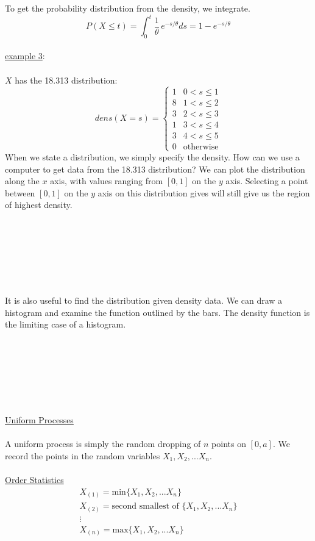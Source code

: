To get the probability distribution from the density, we integrate.
$$P(X\leq t)=\int_{0}^{t} \frac{1}{\theta}\, e^{-s/\theta}ds = 1 - e^{-s/\theta}$$
\\
\underline{example 3}:\\\\$X$ has the 18.313 distribution:
$$dens(X=s)=\left\{\begin{array}{llllll}1&0<s\leq 1\\8&1<s\leq 2\\3&2<s\leq 3\\1&3<s\leq 4\\3&4<s\leq 5\\0&\mbox{otherwise}\end{array}\right.$$  
When we state a distribution, we simply specify the density.  How can we use a computer to get data from the 18.313 distribution?  We can plot the distribution along the $x$ axis, with values ranging from $[0,1]$ on the $y$ axis.  Selecting a point between $[0,1]$ on the $y$ axis on this distribution gives will still give us the region of highest density.\\\\\\\\\\\\\\\\
It is also useful to find the distribution given density data.  We can draw a histogram and examine the function outlined by the bars.  The density function is the limiting case of a histogram.\\\\\\\\\\\\\\\\\underline{Uniform Processes}\\\\A uniform process is simply the random dropping of $n$ points on $[0,a]$.  We record the points in the random variables $X_1, X_2,...X_n$.\\\\\underline{Order Statistics}$$\begin{array}{lllll}X_{(1)}=\mbox{min}\{X_1,X_2,...X_n\}\\X_{(2)}=\mbox{second smallest of } \{X_1,X_2,...X_n\}\\\vdots\\X_{(n)}=\mbox{max}\{X_1,X_2,...X_n\}\end{array}$$

